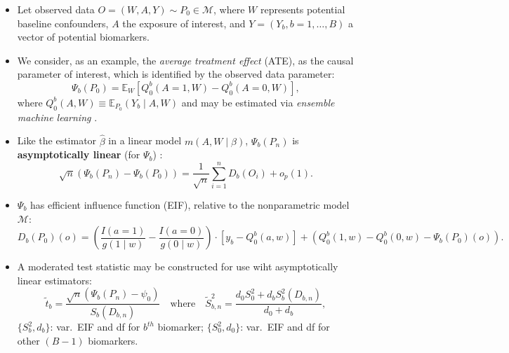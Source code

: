 \documentclass[landscape,a0paper,fontscale=0.285]{baposter} %
\newcommand{\compresslist}{ %
\setlength{\itemsep}{1pt}
\setlength{\parskip}{0pt}
\setlength{\parsep}{0pt}
}
\newcommand{\E}{\mathbb{E}}
\newcommand{\M}{\mathcal{M}}
\newcommand{\1}{\mathbbm{1}}
\begin{document}
\begin{poster}
{\begin{itemize}
  \itemsep0.50pt
  \item Let observed data $O = (W, A, Y) \sim P_0 \in \M$, where $W$ represents
      potential baseline confounders, $A$ the exposure of interest, and
      $Y = ({Y_b}, b = 1, \dots, B)$ a vector of potential biomarkers.
  \item We consider, as an example, the \textit{average treatment effect} (ATE),
      as the causal parameter of interest, which is identified by the observed
      data parameter:
      \begin{equation}\label{ate}
        \Psi_b(P_0) = \E_W[ Q_0^b(A = 1, W) - Q_0^b(A = 0, W)],
      \end{equation}
        where $Q_0^b(A, W) \equiv \E_{P_0}(Y_b \mid A, W)$ and may be estimated
        via \textit{ensemble machine learning}
        \cite{vdl2007super,breiman1996stacked,wolpert1992stacked}.
  \item Like the estimator $\hat{\beta}$ in a linear model $m(A,W \mid \beta)$,
      $\Psi_b(P_n)$ is \textbf{asymptotically linear} (for $\Psi_b$)
      \cite{vdl2011targeted}:
      \begin{equation}\label{asymp_lin}
        \sqrt{n} (\Psi_b(P_n) - \Psi_b(P_0)) = \frac{1}{\sqrt{n}} \sum_{i=1}^n
        D_b(O_i) + o_p(1).
      \end{equation}
  \item $\Psi_b$ has efficient influence function (EIF), relative to the
      nonparametric model $\M$:
      \begin{equation}\label{eif_ate}
        D_b(P_0)(o) = \left(\frac{I(a = 1)}{g(1 \mid w)} -
        \frac{I(a = 0)}{g(0 \mid w)}\right) \cdot \left[y_b - Q_0^b(a, w)\right]
        + \left(Q_0^b(1, w) - Q_0^b(0, w) - \Psi_b(P_0)(o)\right).
      \end{equation}
  \item A moderated test statistic \cite{smyth2004linear,smyth2005limma,
      hejazi2018+supervised} may be constructed for use wiht asymptotically
      linear estimators:
      \begin{equation}\label{mod_eif}
        \widetilde{t}_b = \frac{\sqrt{n}(\Psi_b(P_n) - \psi_0)}{S_b(D_{b,n})}
        \quad \text{where} \quad
        \widetilde{S}_{b,n}^2 = \frac{d_0S_0^2 + d_bS_b^2(D_{b,n})}{d_0 + d_b},
      \end{equation}
    $\{S_b^2, d_b\}$: var.~EIF and df for $b^{th}$ biomarker;
    $\{S_0^2, d_0\}$: var.~EIF and df for other $(B-1)$ biomarkers.
\end{itemize}

}


\end{poster}
\end{document}
